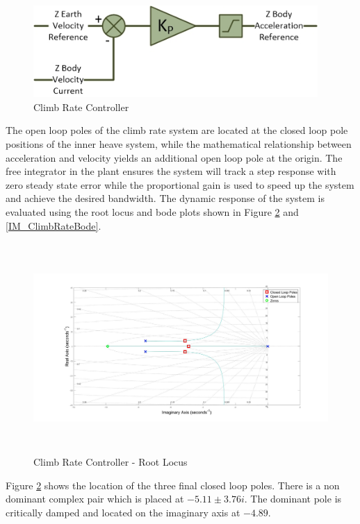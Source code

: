 	 \begin{figure}[H]
	 	\centering
	 	\includegraphics[height = 3.5cm]{../References/Diagrams/ClimbRateController.jpg}
	 	\caption{Climb Rate Controller}
	 	\label{IM_ClimbRateController}
	 \end{figure}		
	 
	 The open loop poles of the climb rate system are located at the closed loop pole positions of the inner heave system, while the mathematical relationship between acceleration and velocity yields an additional open loop pole at the origin. The free integrator in the plant ensures the system will track a step response with zero steady state error while the proportional gain is used to speed up the system and achieve the desired bandwidth. The dynamic response of the system is evaluated using the root locus and bode plots shown in Figure \ref{IM_ClimbRateRoot} and \ref{IM_ClimbRateBode}.
	 
	 \begin{figure}[H]
	 	\centering
	 	\includegraphics[height = 8cm]{../Design/Matlab/Controllers/climb_rate_root.jpg}
	 	\caption{Climb Rate Controller -  Root Locus}
	 	\label{IM_ClimbRateRoot}
	 \end{figure}
	 
	 Figure \ref{IM_ClimbRateRoot} shows the location of the three final closed loop poles. There is a non dominant complex pair which is placed at $-5.11 \pm 3.76i$. The dominant pole is critically damped and located on the imaginary axis at $-4.89$.
	 
